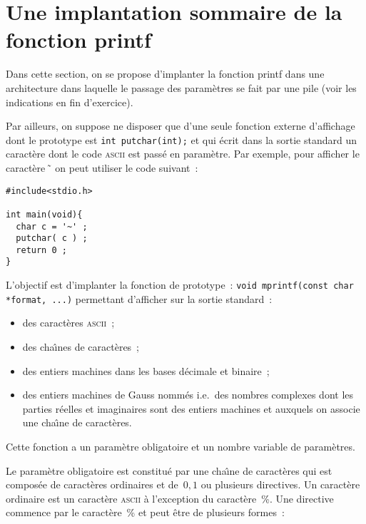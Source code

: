 \section{Une implantation sommaire de la fonction printf}
\label{sec:printf}
Dans cette section, on se propose d'implanter la fonction printf dans
une architecture dans laquelle le passage des param\`etres se fait par
une pile (voir les indications en fin d'exercice).

Par ailleurs, on suppose ne disposer que d'une seule fonction externe
d'affichage dont le prototype est \verb?int putchar(int);? et qui
\'ecrit dans la sortie standard un caract\`ere dont le code
\textsc{ascii} est pass\'e en param\`etre. Par exemple, pour afficher
le caract\`ere~\~\, on peut utiliser le code suivant~:
\begin{verbatim}
#include<stdio.h>

int main(void){
  char c = '~' ;
  putchar( c ) ;
  return 0 ;
}
\end{verbatim}
L'objectif est d'implanter la fonction de prototype~:
\verb?void mprintf(const char *format, ...)?
permettant d'afficher sur la sortie standard~:
\begin{itemize}
\item des caract\`eres \textsc{ascii}~;
\item des cha\^\i{}nes de caract\`eres~;
\item des entiers machines dans les bases d\'ecimale et binaire~;
\item des entiers machines de Gauss nomm\'es i.e.\ des nombres
  complexes dont les parties r\'eelles et imaginaires sont des entiers
  machines et auxquels on associe une cha\^\i{}ne de caract\`eres.
\end{itemize}
\par
Cette fonction a un param\`etre obligatoire et un nombre variable de
param\`etres. 
\par
Le param\`etre obligatoire est constitu\'e par une cha\^\i{}ne de
caract\`eres qui est compos\'ee de caract\`eres ordinaires et
de~${0, 1}$ ou plusieurs directives.  Un caract\`ere ordinaire est un
caract\`ere \textsc{ascii} \`a l'exception du caract\`ere~\%.  Une directive
commence par le caract\`ere~\% et peut \^etre de plusieurs formes~:
